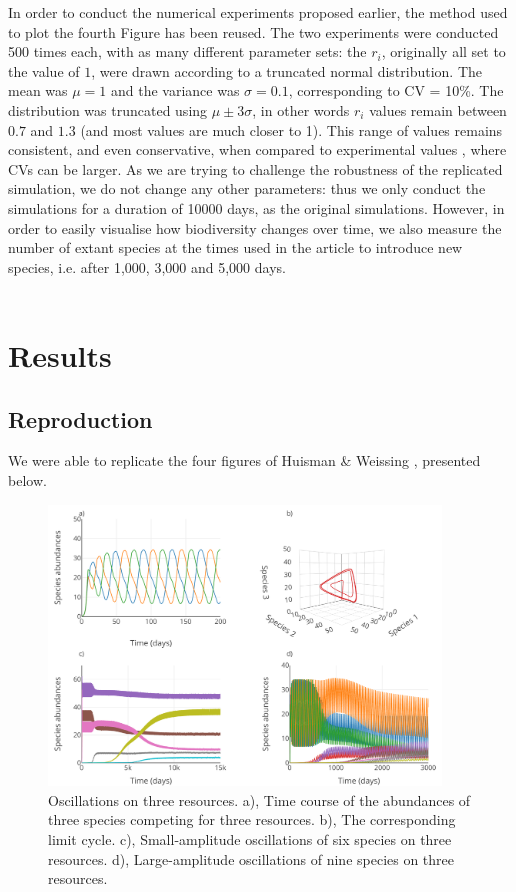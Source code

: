 In order to conduct the numerical experiments proposed earlier, the method used to plot the fourth Figure has been reused. The two experiments were conducted 500 times each, with as many different parameter sets: the $r_i$, originally all set to the value of $1$, were drawn according to a truncated normal distribution. The mean was $\mu=1$ and the variance was $\sigma=0.1$, corresponding to CV = 10\%. The distribution was truncated using $\mu\pm3\sigma$, in other words $r_i$ values remain between $0.7$ and $1.3$ (and most values are much closer to 1). This range of values remains consistent, and even conservative, when compared to experimental values \cite{2015:Edwards}, where CVs can be larger. As we are trying to challenge the robustness of the replicated simulation, we do not change any other parameters: thus we only conduct the simulations for a duration of 10000 days, as the original simulations. However, in order to easily visualise how biodiversity changes over time, we also measure the number of extant species at the times used in the article to introduce new species, i.e. after 1,000, 3,000 and 5,000 days.\\~\\

\section{Results}

\subsection{Reproduction}

We were able to replicate the four figures of Huisman \& Weissing \cite{1999:Huisman}, presented below. 

\begin{figure}[H]
\begin{center} 
 \includegraphics[width=0.93\textwidth]{../Code/Figures/Figure_1.pdf}
  \caption{Oscillations on three resources. a), Time course of the abundances of three species competing for three resources. b), The corresponding limit cycle. c), Small-amplitude oscillations of six species on three resources. d), Large-amplitude oscillations of nine species on three resources.}
  \label{figures:Fig1}
\end{center}
\end{figure}


